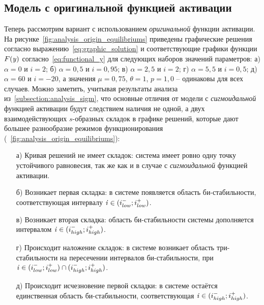 
%
%

\subsection{Модель с оригинальной функцией активации}  \label{subsection:analysis_origin}

Теперь рассмотрим вариант с использованием \textit{оригинальной} функции активации. На рисунке~\ref{fig:analysis_origin_equilibriums} приведены графические решения согласно выражению~\eqref{eq:graphic_solution} и соответствующие графики функции $F(\mathit{y})$ согласно~\eqref{eq:functional_y} для следующих наборов значений параметров: а) $\alpha = 0  $ и $i =  2   $; б) $\alpha = 0,5$ и $i =  0,95$; в) $\alpha = 2,5$ и $i =  2   $; г) $\alpha = 5,5$ и $i =  0,5 $; д) $\alpha = 60 $ и $i = -20$, а значения  $\mu = 0,75$, $\theta = 1$, $p = 1,0$ -- одинаковы для всех случаев. Можно заметить, учитывая результаты анализа из~\autoref{subsection:analysis_sigm}, что основные отличия от модели с \textit{сигмоидальной} функцией активации будут следствием наличия не одной, а двух взаимодействующих $s$-образных складок в графике решений, которые дают большее разнообразие режимов функционирования (\seefigure~\ref{fig:analysis_origin_equilibriums}):
\begin{itemize}
    \item[а)] Кривая решений не имеет складок: система имеет ровно одну точку устойчивого равновесия, так же как и в случае с \textit{сигмоидальной} функцией активации.
    \item[б)] Возникает первая складка: в системе появляется область би-стабильности, соответствующая интервалу $\mathit{i} \in (i_{low}^{-}; i_{low}^{+})$.
    \item[в)] Возникает вторая складка: область би-стабильности системы дополняется интервалом $\mathit{i} \in (i_{high}^{-}; i_{high}^{+})$.
    \item[г)] Происходит наложение складок: в системе возникает область три-стабильности на пересечении интервалов би-стабильности, \ie при $\mathit{i} \in (i_{low}^{-}; i_{low}^{+}) \cap (i_{high}^{-}; i_{high}^{+})$.
    \item[д)] Происходит исчезновение первой складки: в системе остаётся единственная область би-стабильности, соответствующая $\mathit{i} \in (i_{high}^{-}; i_{high}^{+})$.
\end{itemize}

